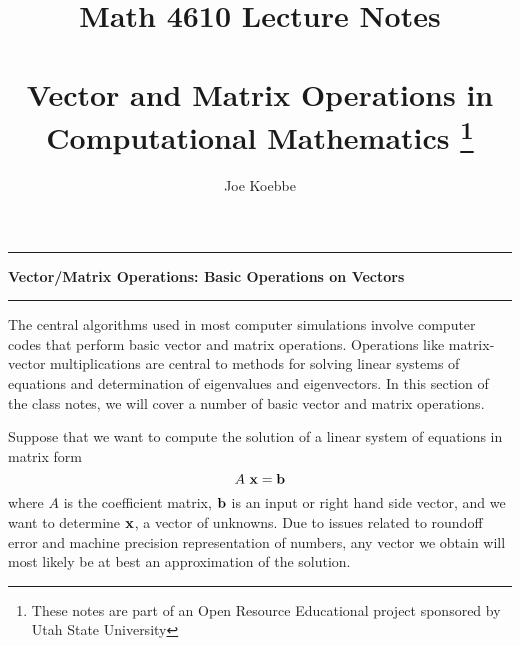 \documentclass[10pt,fleqn]{article}
\title{Math 4610 Lecture Notes \\
            \ \\
        Vector and Matrix Operations in Computational Mathematics
  \footnote{These notes are part of an Open Resource Educational project
            sponsored by Utah State University}}
\author{Joe Koebbe}
\begin{document}
\maketitle
\newpage

\vskip0.1in\hrule\vskip0.1in
\noindent
{\bf Vector/Matrix Operations: Basic Operations on Vectors}
\vskip0.1in\hrule\vskip0.1in
\noindent
The central algorithms used in most computer simulations involve computer codes
that perform basic vector and matrix operations. Operations like matrix-vector
multiplications are central to methods for solving linear systems of equations
and determination of eigenvalues and eigenvectors. In this section of the class
notes, we will cover a number of basic vector and matrix operations.

Suppose that we want to compute the solution of a linear system of equations in
matrix form
$$
  A\ {\bf x} = {\bf b}
$$
where $A$ is the coefficient matrix, ${\bf b}$ is an input or right hand side
vector, and we want to determine ${\bf x}$, a vector of unknowns. Due to issues
related to roundoff error and machine precision representation of numbers, any
vector we obtain will most likely be at best an approximation of the solution.
\end{document}
